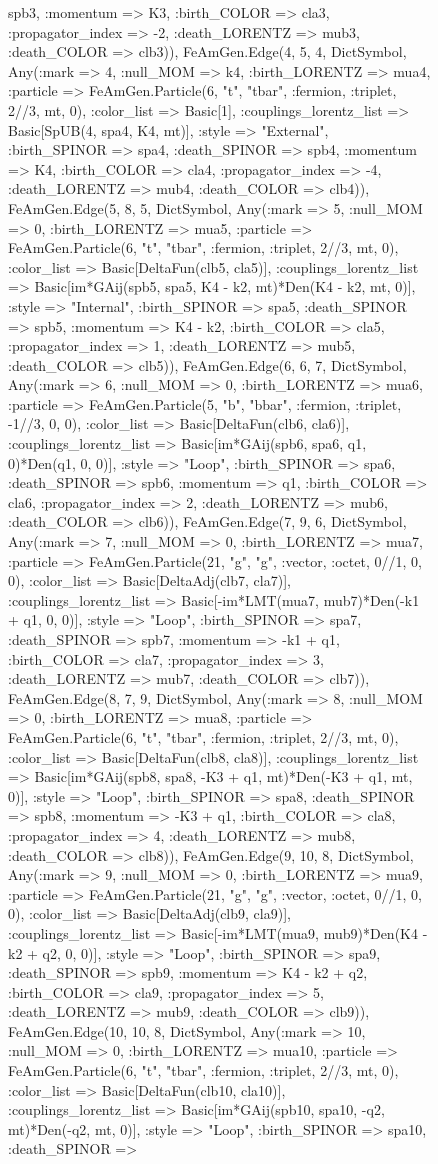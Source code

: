 \documentclass{revtex4}
\begin{document}
\begin{figure}[!htb]
\begin{center}
{spb3, :momentum => K3, :birth_COLOR => cla3, :propagator_index => -2, :death_LORENTZ => mub3, :death_COLOR => clb3)), FeAmGen.Edge(4, 5, 4, Dict{Symbol, Any}(:mark => 4, :null_MOM => k4, :birth_LORENTZ => mua4, :particle => FeAmGen.Particle(6, "t", "tbar", :fermion, :triplet, 2//3, mt, 0), :color_list => Basic[1], :couplings_lorentz_list => Basic[SpUB(4, spa4, K4, mt)], :style => "External", :birth_SPINOR => spa4, :death_SPINOR => spb4, :momentum => K4, :birth_COLOR => cla4, :propagator_index => -4, :death_LORENTZ => mub4, :death_COLOR => clb4)), FeAmGen.Edge(5, 8, 5, Dict{Symbol, Any}(:mark => 5, :null_MOM => 0, :birth_LORENTZ => mua5, :particle => FeAmGen.Particle(6, "t", "tbar", :fermion, :triplet, 2//3, mt, 0), :color_list => Basic[DeltaFun(clb5, cla5)], :couplings_lorentz_list => Basic[im*GAij(spb5, spa5, K4 - k2, mt)*Den(K4 - k2, mt, 0)], :style => "Internal", :birth_SPINOR => spa5, :death_SPINOR => spb5, :momentum => K4 - k2, :birth_COLOR => cla5, :propagator_index => 1, :death_LORENTZ => mub5, :death_COLOR => clb5)), FeAmGen.Edge(6, 6, 7, Dict{Symbol, Any}(:mark => 6, :null_MOM => 0, :birth_LORENTZ => mua6, :particle => FeAmGen.Particle(5, "b", "bbar", :fermion, :triplet, -1//3, 0, 0), :color_list => Basic[DeltaFun(clb6, cla6)], :couplings_lorentz_list => Basic[im*GAij(spb6, spa6, q1, 0)*Den(q1, 0, 0)], :style => "Loop", :birth_SPINOR => spa6, :death_SPINOR => spb6, :momentum => q1, :birth_COLOR => cla6, :propagator_index => 2, :death_LORENTZ => mub6, :death_COLOR => clb6)), FeAmGen.Edge(7, 9, 6, Dict{Symbol, Any}(:mark => 7, :null_MOM => 0, :birth_LORENTZ => mua7, :particle => FeAmGen.Particle(21, "g", "g", :vector, :octet, 0//1, 0, 0), :color_list => Basic[DeltaAdj(clb7, cla7)], :couplings_lorentz_list => Basic[-im*LMT(mua7, mub7)*Den(-k1 + q1, 0, 0)], :style => "Loop", :birth_SPINOR => spa7, :death_SPINOR => spb7, :momentum => -k1 + q1, :birth_COLOR => cla7, :propagator_index => 3, :death_LORENTZ => mub7, :death_COLOR => clb7)), FeAmGen.Edge(8, 7, 9, Dict{Symbol, Any}(:mark => 8, :null_MOM => 0, :birth_LORENTZ => mua8, :particle => FeAmGen.Particle(6, "t", "tbar", :fermion, :triplet, 2//3, mt, 0), :color_list => Basic[DeltaFun(clb8, cla8)], :couplings_lorentz_list => Basic[im*GAij(spb8, spa8, -K3 + q1, mt)*Den(-K3 + q1, mt, 0)], :style => "Loop", :birth_SPINOR => spa8, :death_SPINOR => spb8, :momentum => -K3 + q1, :birth_COLOR => cla8, :propagator_index => 4, :death_LORENTZ => mub8, :death_COLOR => clb8)), FeAmGen.Edge(9, 10, 8, Dict{Symbol, Any}(:mark => 9, :null_MOM => 0, :birth_LORENTZ => mua9, :particle => FeAmGen.Particle(21, "g", "g", :vector, :octet, 0//1, 0, 0), :color_list => Basic[DeltaAdj(clb9, cla9)], :couplings_lorentz_list => Basic[-im*LMT(mua9, mub9)*Den(K4 - k2 + q2, 0, 0)], :style => "Loop", :birth_SPINOR => spa9, :death_SPINOR => spb9, :momentum => K4 - k2 + q2, :birth_COLOR => cla9, :propagator_index => 5, :death_LORENTZ => mub9, :death_COLOR => clb9)), FeAmGen.Edge(10, 10, 8, Dict{Symbol, Any}(:mark => 10, :null_MOM => 0, :birth_LORENTZ => mua10, :particle => FeAmGen.Particle(6, "t", "tbar", :fermion, :triplet, 2//3, mt, 0), :color_list => Basic[DeltaFun(clb10, cla10)], :couplings_lorentz_list => Basic[im*GAij(spb10, spa10, -q2, mt)*Den(-q2, mt, 0)], :style => "Loop", :birth_SPINOR => spa10, :death_SPINOR => }
\end{center}
\end{figure}
\end{document}
